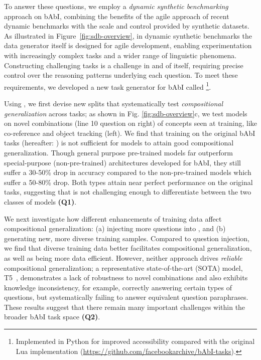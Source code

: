 To answer these questions, we employ a \emph{dynamic synthetic benchmarking} approach on bAbI, combining the benefits of the agile approach of recent dynamic benchmarks with the scale and control provided by synthetic datasets. As illustrated in Figure~\ref{fig:sdb-overview}, in dynamic synthetic benchmarks the data generator itself is designed for agile development, enabling experimentation with increasingly complex tasks and a wider range of linguistic phenomena. Constructing challenging tasks is a challenge in and of itself, requiring precise control over the reasoning patterns underlying each question. To meet these requirements, we developed a new task generator for bAbI called \pybabi\footnote{Implemented in Python for improved accessibility compared with the original Lua implementation (\url{https://github.com/facebookarchive/bAbI-tasks}).}. 



Using \pybabi, we first devise new splits that systematically test \emph{compositional generalization} across tasks; as shown in Fig. \ref{fig:sdb-overview}c, we test models on novel combinations (line 10 question on right) of concepts  seen at training, like co-reference and object tracking (left). We find that training on the original bAbI tasks (hereafter: \babibm) is not sufficient for models to attain good compositional generalization. Though general purpose pre-trained models far outperform special-purpose (non-pre-trained) architectures developed for bAbI, they still suffer a 30-50\% drop in accuracy compared to the non-pre-trained models which suffer a 50-80\% drop. Both types attain near perfect performance on the original tasks, suggesting that \babibm is not challenging enough to differentiate between the two classes of models \textbf{(Q1)}. 

We next investigate how different enhancements of training data affect compositional generalization: (a) injecting more questions into \babibm, and (b) generating new, more diverse training samples. Compared to question injection, we find that diverse training data better facilitates compositional generalization, as well as being more data efficient. However, neither approach drives \emph{reliable} compositional generalization; a representative state-of-the-art (SOTA) model, T5~\citep{2020t5}, demonstrates a lack of robustness to novel combinations and also exhibits knowledge inconsistency, for example, correctly answering certain types of questions, but systematically failing to answer equivalent question paraphrases. These results suggest that there remain many important challenges within the broader bAbI task space \textbf{(Q2)}. 



